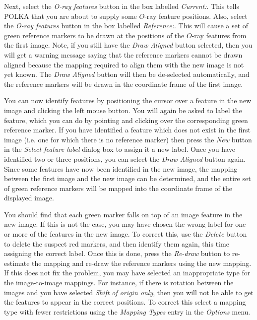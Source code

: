 \documentclass[11pt]{article}
\newcommand{\htmlref}[2]{#1}
\begin{document}
Next, select the \emph{O-ray features} button in the box labelled
\htmlref{\emph{Current:}}{POLKA_CURRENT}. This tells POLKA that you are
about to supply some $O$-ray feature positions. Also, select the
\emph{O-ray features} button in the box labelled
\htmlref{\emph{Reference:}}{POLKA_REFERENCE}. This will cause
a set of green reference markers to be drawn at the positions of the
$O$-ray features from the first image. Note, if you still have the
\htmlref{\emph{Draw Aligned}}{POLKA_DRAW_ALIGNED} button selected, then
you will get a warning message saying that the reference markers cannot
be drawn aligned because the mapping required to align them with the new
image is not yet known. The \emph{Draw Aligned} button will then be
de-selected automatically, and the reference markers will be drawn in the
coordinate frame of the first image.

You can now identify features by positioning the cursor over a feature in
the new image and clicking the left mouse button. You will again be asked
to label the feature, which you can do by pointing and clicking over the
corresponding green reference marker. If you have identified a feature
which does not exist in the first image (i.e. one for which there is no
reference marker) then press the \emph{New} button in the \htmlref{{\em
Select feature label}}{POLKA_GET_LABEL} dialog box to assign it a new
label. Once you have identified two or three positions, you can select
the \htmlref{\emph{Draw Aligned}}{POLKA_DRAW_ALIGNED} button again. Since
some features have now been identified in the new image, the mapping
between the first image and the new image can be determined, and the
entire set of green reference markers will be mapped into the coordinate
frame of the displayed image.

You should find that each green marker falls on top of an image feature
in the new image. If this is not the case, you may have chosen the wrong
label for one or more of the features in the new image. To correct this,
use the \htmlref{\emph{Delete}}{POLKA_DELETE} button to delete the suspect
red markers, and then identify them again, this time assigning the
correct label. Once this is done, press the \htmlref{{\em
Re-draw}}{POLKA_REDRAW} button to re-estimate the mapping and re-draw the
reference markers using the new mapping. If this does not fix the
problem, you may have selected an inappropriate type for the
image-to-image mappings. For instance, if there is rotation between the
images and you have selected \emph{Shift of origin only}, then you will
not be able to get the features to appear in the correct positions. To
correct this select a mapping type with fewer restrictions using the
\htmlref{\emph{Mapping Types}}{POLKA_MAP_TYPES} entry in the \htmlref{{\em
Options}}{POLKA_OPTIONS_MENU} menu.
\end{document}
